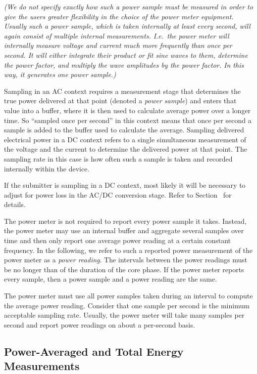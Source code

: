 \textit{(We do not specify exactly how such a power sample must be measured in order to give the users greater flexibility in the choice of the power meter equipment.
Usually such a power sample, which is taken internally at least every second, will again consist of multiple internal measurements.
I.e.~the power meter will internally measure voltage and current much more frequently than once per second.
It will either integrate their product or fit sine waves to them, determine the power factor, and multiply the wave amplitudes by the power factor.
In this way, it generates one power sample.)}

Sampling in an AC context requires a measurement stage that determines the true power delivered at that point (denoted a \textit{power sample}) and enters that value into a buffer, where it is then used to calculate average power over a longer time.
So ``sampled once per second'' in this context means that once per second a sample is added to the buffer used to calculate the average.
Sampling delivered electrical power in a DC context refers to a single simultaneous measurement of the voltage and the current to determine the delivered power at that point.
The sampling rate in this case is how often such a sample is taken and recorded internally within the device.

If the submitter is sampling in a DC context, most likely it will be necessary to adjust for power loss in the AC/DC conversion stage.
Refer to Section~ for details.

The power meter is not required to report every power sample it takes.
Instead, the power meter may use an internal buffer and aggregate several samples over time and then only report one average power reading at a certain constant frequency.
In the following, we refer to such a reported power measurement of the power meter as a \textit{power reading}.
The intervals between the power readings must be no longer than \MaxReadingIntervalCorePhaseLTwoThree{} of the duration of the core phase.
If the power meter reports every sample, then a power sample and a power reading are the same.

The power meter must use all power samples taken during an interval to compute the average power reading.
Consider that one sample per second is the minimum acceptable sampling rate.
Usually, the power meter will take many samples per second and report power readings on about a per-second basis.

\subsection{Power-Averaged and Total Energy Measurements}
\label{sec:PAaTEM}

